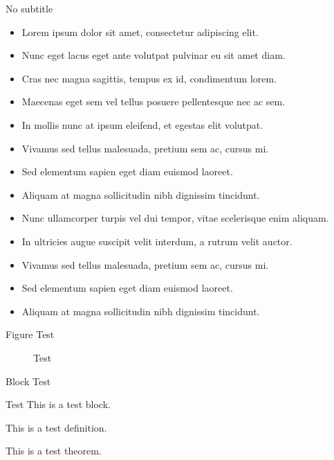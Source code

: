 \documentclass[aspectratio=169]{beamer}
\begin{document}
\begin{frame}{No subtitle}
\begin{itemize}
	\item Lorem ipsum dolor sit amet, consectetur adipiscing elit.
	\item Nunc eget lacus eget ante volutpat pulvinar eu sit amet diam.
	\item Cras nec magna sagittis, tempus ex id, condimentum lorem.
	\item Maecenas eget sem vel tellus posuere pellentesque nec ac sem.
	\item In mollis nunc at ipsum eleifend, et egestas elit volutpat.
	\item Vivamus sed tellus malesuada, pretium sem ac, cursus mi.
	\item Sed elementum sapien eget diam euismod laoreet.
	\item Aliquam at magna sollicitudin nibh dignissim tincidunt.
	\item Nunc ullamcorper turpis vel dui tempor, vitae scelerisque enim aliquam.
	\item In ultricies augue suscipit velit interdum, a rutrum velit auctor.
	\item Vivamus sed tellus malesuada, pretium sem ac, cursus mi.
	\item Sed elementum sapien eget diam euismod laoreet.
	\item Aliquam at magna sollicitudin nibh dignissim tincidunt.
\end{itemize}
\end{frame}

\begin{frame}{Figure Test}
\begin{figure}
	\caption{Test}
\end{figure}
\end{frame}

\begin{frame}{Block Test}
\begin{block}{Test}
This is a test block.
\end{block}
\vfill
\begin{definition}
This is a test definition.
\end{definition}
\vfill
\begin{theorem}
This is a test theorem.
\end{theorem}
\end{frame}
\end{document}
